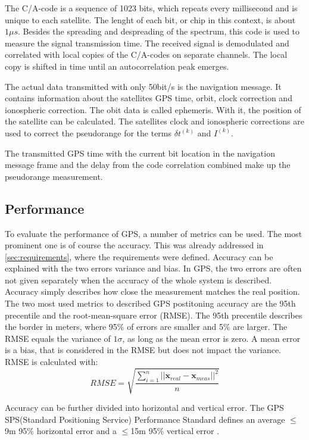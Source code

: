 The C/A-code is a sequence of 1023 bits, which repeats every millisecond and is unique to each satellite.
The lenght of each bit, or chip in this context, is about $1\mu s$.
Besides the spreading and despreading of the spectrum, this code is used to measure the signal transmission time.
The received signal is demodulated and correlated with local copies of the C/A-codes on separate channels.
The local copy is shifted in time until an autocorrelation peak emerges.

The actual data transmitted with only 50bit/s is the navigation message.
It contains information about the satellites GPS time, orbit, clock correction and ionospheric correction.
The obit data is called ephemeris.
With it, the position of the satellite can be calculated.
The satellites clock and ionospheric corrections are used to correct the pseudorange for the terms $\delta t^{(k)}$ and $I^{(k)}$.

The transmitted GPS time with the current bit location in the navigation message frame and the delay from the code correlation combined make up the pseudorange measurement.

\subsection{Performance}

To evaluate the performance of GPS, a number of metrics can be used.
The most prominent one is of course the accuracy.
This was already addressed in \ref{sec:requirements}, where the requirements were defined.
Accuracy can be explained with the two errors variance and bias.
In GPS, the two errors are often not given separately when the accuracy of the whole system is described.
Accuracy simply describes how close the measurement matches the real position.
The two most used metrics to described GPS postitoning accuracy are the 95th precentile and the root-mean-square error (RMSE).
The 95th precentile describes the border in meters, where 95\% of errors are smaller and 5\% are larger.
The RMSE equals the variance of $1\sigma$, as long as the mean error is zero.
A mean error is a bias, that is considered in the RMSE but does not impact the variance.
RMSE is calculated with:
\begin{equation}
 RMSE = \sqrt{\frac{\sum\limits_{i=1}^n \lvert\lvert \textbf{x}_{real} - \textbf{x}_{meas} \rvert\rvert^2}{n}}
\end{equation}

Accuracy can be further divided into horizontal and vertical error.
The GPS SPS(Standard Positioning Service) Performance Standard defines an average $\leq$9m 95\% horizontal error and a $\leq$15m 95\% vertical error \cite{SPS_Performance}.

